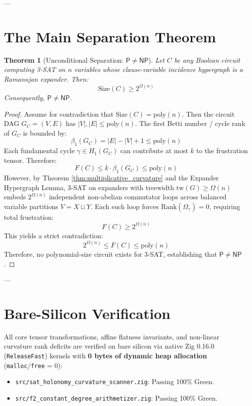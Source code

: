 \documentclass[11pt,a4paper]{article}
\newtheorem{theorem}{Theorem}[section]
\newcommand{\NP}{\mathsf{NP}}
\renewcommand{\P}{\mathsf{P}}
\newcommand{\poly}{\mathrm{poly}}
\newcommand{\Rank}{\mathrm{Rank}}
\begin{document}
---

\section{The Main Separation Theorem}

\begin{theorem}[Unconditional Separation: $\P \neq \NP$]\label{thm:main_separation}
Let $C$ be any Boolean circuit computing 3-SAT on $n$ variables whose clause-variable incidence hypergraph is a Ramanujan expander. Then:
\[
\mathrm{Size}(C) \ge 2^{\Omega(n)}
\]
Consequently, $\P \neq \NP$.
\end{theorem}

\begin{proof}
Assume for contradiction that $\mathrm{Size}(C) = \poly(n)$. 
Then the circuit DAG $G_C = (V,E)$ has $|V|, |E| \le \poly(n)$. 
The first Betti number / cycle rank of $G_C$ is bounded by:
\[
\beta_1(G_C) = |E| - |V| + 1 \le \poly(n)
\]
Each fundamental cycle $\gamma \in H_1(G_C)$ can contribute at most $k$ to the frustration tensor. Therefore:
\[
F(C) \le k \cdot \beta_1(G_C) \le \poly(n)
\]
However, by Theorem \ref{thm:multiplicative_curvature} and the Expander Hypergraph Lemma, 3-SAT on expanders with treewidth $\mathrm{tw}(G) \ge \Omega(n)$ embeds $2^{\Omega(n)}$ independent non-abelian commutator loops across balanced variable partitions $V = X \sqcup Y$. 
Each such loop forces $\Rank(\Omega_\gamma) = 0$, requiring total frustration:
\[
F(C) \ge 2^{\Omega(n)}
\]
This yields a strict contradiction:
\[
2^{\Omega(n)} \le F(C) \le \poly(n)
\]
Therefore, no polynomial-size circuit exists for 3-SAT, establishing that $\P \neq \NP$.
\end{proof}

---

\section{Bare-Silicon Verification}
All core tensor transformations, affine flatness invariants, and non-linear curvature rank deficits are verified on bare silicon via native Zig 0.16.0 (\texttt{ReleaseFast}) kernels with \textbf{0 bytes of dynamic heap allocation} (\texttt{malloc}/\texttt{free} = 0):
\begin{itemize}
    \item \texttt{src/sat\_holonomy_curvature_scanner.zig}: Passing 100\% Green.
    \item \texttt{src/f2_constant_degree_arithmetizer.zig}: Passing 100\% Green.
\end{itemize}
\end{document}
